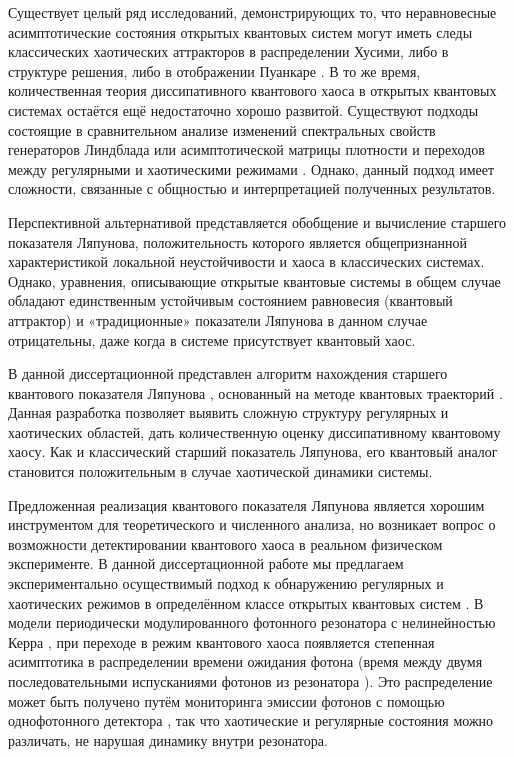Существует целый ряд исследований, демонстрирующих то, что неравновесные асимптотические состояния открытых квантовых систем могут иметь следы классических хаотических аттракторов в распределении Хусими, либо в структуре решения, либо в отображении Пуанкаре \autocite{Spiller1994, Brun1996, Hartmann2017, Ivanchenko2017, Carlo2017, Wang2018}. 
В то же время, количественная теория диссипативного квантового хаоса в открытых квантовых системах остаётся ещё недостаточно хорошо развитой. 
Существуют подходы состоящие в сравнительном анализе изменений спектральных свойств генераторов Линдблада или асимптотической матрицы плотности \autocite{Lindblad1976, book2007} и переходов между регулярными и хаотическими режимами \autocite{Hartmann2017, Ivanchenko2017, Grobe1988, Prosen2013}. 
Однако, данный подход имеет сложности, связанные с общностью и интерпретацией полученных результатов.

Перспективной альтернативой представляется обобщение и вычисление старшего показателя Ляпунова, положительность которого является общепризнанной характеристикой локальной неустойчивости и хаоса в классических системах. 
Однако, уравнения, описывающие открытые квантовые системы в общем случае обладают единственным устойчивым состоянием равновесия \autocite{book2007, Lucia2015} (квантовый аттрактор) и «традиционные» показатели Ляпунова в данном случае отрицательны, даже когда в системе присутствует квантовый хаос.

В данной диссертационной представлен алгоритм нахождения старшего квантового показателя Ляпунова \cite{Yusipov2019_2}, основанный на методе квантовых траекторий \autocite{Dum1992, Molmer1993, Plenio1998, Daley2014}.
Данная разработка позволяет выявить сложную структуру регулярных и хаотических областей, дать количественную оценку диссипативному квантовому хаосу. Как и классический старший показатель Ляпунова, его квантовый аналог становится положительным в случае хаотической динамики системы.

Предложенная реализация квантового показателя Ляпунова является хорошим инструментом для теоретического и численного анализа, но возникает вопрос о возможности детектировании квантового хаоса в реальном физическом эксперименте.
В данной диссертационной работе мы предлагаем экспериментально осуществимый подход к обнаружению регулярных и хаотических режимов в определённом классе открытых квантовых систем \cite{Yusipov2020}.
В модели периодически модулированного фотонного резонатора с нелинейностью Керра \autocite{Spiller1994}, при переходе в режим квантового хаоса появляется степенная асимптотика в распределении времени ожидания фотона (время между двумя последовательными испусканиями фотонов из резонатора \autocite{Vyas1989, Carmichael1989, Zhang2018}).
Это распределение может быть получено путём мониторинга эмиссии фотонов с помощью однофотонного детектора \autocite{Delteil2014, Cohen2015}, так что хаотические и регулярные состояния можно различать, не нарушая динамику внутри резонатора.

